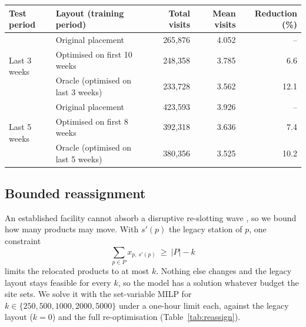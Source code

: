 \documentclass[]{interact}
\begin{document}
\begin{table}[H]
\centering
{}
{\begin{tabular*}{\textwidth}{@{\extracolsep{\fill}}llrrr@{}}
\toprule
Test period & Layout (training period) & Total visits & Mean visits & Reduction (\%) \\
\midrule
\multirow{3}{*}{Last 3 weeks}
 & Original placement & 265{,}876 & 4.052 & -- \\
 & Optimised on first 10 weeks & 248{,}358 & 3.785 & 6.6 \\
 & Oracle (optimised on last 3 weeks) & 233{,}728 & 3.562 & 12.1 \\
\midrule
\multirow{3}{*}{Last 5 weeks}
 & Original placement & 423{,}593 & 3.926 & -- \\
 & Optimised on first 8 weeks & 392{,}318 & 3.636 & 7.4 \\
 & Oracle (optimised on last 5 weeks) & 380{,}356 & 3.525 & 10.2 \\
\bottomrule
\end{tabular*}}
\label{tab:temporal}
\end{table}

\subsection{Bounded reassignment}\label{sec:reassign}
An established facility cannot absorb a disruptive re-slotting wave \citep{chabot2024reassignment}, so we bound how many products may move. With $s'(p)$ the legacy station of $p$, one constraint
\begin{equation}
\sum_{p \in P} x_{p,\,s'(p)} \ \ge\ |P| - k
\label{eq:reassign}
\end{equation}
limits the relocated products to at most $k$. Nothing else changes and the legacy layout stays feasible for every $k$, so the model has a solution whatever budget the site sets. We solve it with the set-variable MILP for $k \in \{250, 500, 1000, 2000, 5000\}$ under a one-hour limit each, against the legacy layout ($k=0$) and the full re-optimisation (Table~\ref{tab:reassign}).
\end{document}

